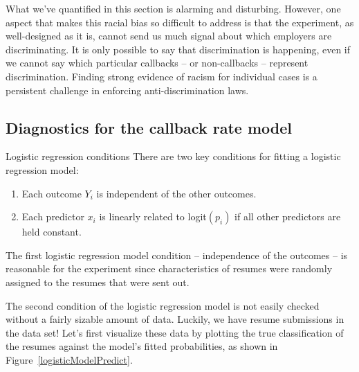 What we've quantified in this section is alarming and disturbing.
However, one aspect that makes this racial bias so difficult to
address is that the experiment, as well-designed as it is,
cannot send us much signal about which employers are
discriminating.
It is only possible to say that discrimination is happening,
even if we cannot say which particular callbacks
-- or non-callbacks -- represent discrimination.
Finding strong evidence of racism for individual cases is
a persistent challenge in enforcing anti-discrimination laws.



\subsection{Diagnostics for the callback rate model}
\label{logistic_regr_diagnostics_subsection}

\begin{onebox}{Logistic regression conditions}
There are two key conditions for fitting a logistic regression model:\vspace{-1mm}
\begin{enumerate}
\setlength{\itemsep}{0mm}
\item
    Each outcome $Y_i$ is independent of the other outcomes.
\item
    Each predictor $x_i$ is linearly related to logit$(p_i)$
    if all other predictors are held constant.
\end{enumerate}
\end{onebox}

The first logistic regression model condition
-- independence of the outcomes --
is reasonable for the experiment since characteristics
of resumes were randomly assigned to the resumes that
were sent out.

The second condition of the logistic regression model is
not easily checked without a fairly sizable amount of data.
Luckily, we have \resN{} resume submissions in the data set!
Let's first visualize these data by plotting the true
classification of the resumes against the model's fitted
probabilities, as shown in
Figure~\ref{logisticModelPredict}.

